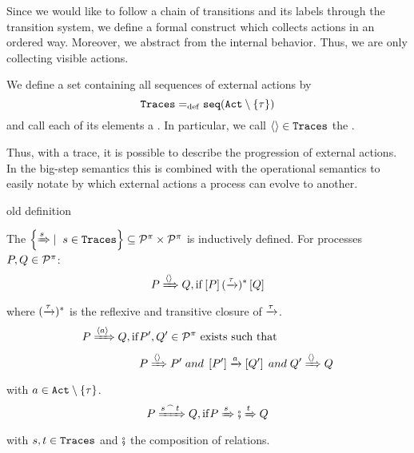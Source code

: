 Since we would like to follow a chain of transitions and its labels through the transition system, we define a formal construct which collects actions in an ordered way. Moreover, we abstract from the internal behavior. Thus, we are only collecting visible actions.

\begin{definition}[Traces]
\label{def_traces}
	We define a set containing all sequences of external actions by
		\[\tr \define \seqset{\actions\setminus\set{\tau}}\]
	and call each of its elements a . In particular, we call $\langle\rangle\in\mathtt{Traces}$ the .
\end{definition}

Thus, with a trace, it is possible to describe the progression of external actions. In the big-step semantics this is combined with the operational semantics to easily notate by which external actions a process can evolve to another.

\begin{old}{old definition}
\begin{definition}
\label{def_bigstep_semantics}
	The  $\set[s\in\tr]{\bigstep{s}}\subseteq\procs\times\procs$ is inductively defined. For processes $P,Q\in\mathcal P^{\pi}$:
		\[P\xRightarrow{\langle\rangle}Q, \mathrm{if} \left[P\right](\xrightarrow{\tau})^*\left[Q\right]\]
	where $(\xrightarrow{\tau})^*$ is the reflexive and transitive closure of $\xrightarrow{\tau}$.
		\begin{align*}
			P\xRightarrow{\langle a\rangle}Q,\mathrm{if}& P',Q'\in\mathcal P^{\pi}\text{ exists such that} \\
			&P\xRightarrow{\langle\rangle}P'\;and\;\left[P'\right]\xrightarrow{a}\left[Q'\right]\;and\;Q'\xRightarrow{\langle\rangle}Q
		\end{align*}
	with $a\in\actions\setminus\set{\tau}$.
		\[P\xRightarrow{{s}^{\,\frown{}\,}{t}}Q,\mathrm{if} P\xRightarrow{s}\fatsemi\xRightarrow{t}Q\]
	with $s,t\in\mathtt{Traces}$ and $\fatsemi$ the composition of relations.
\end{definition}
\end{old}

